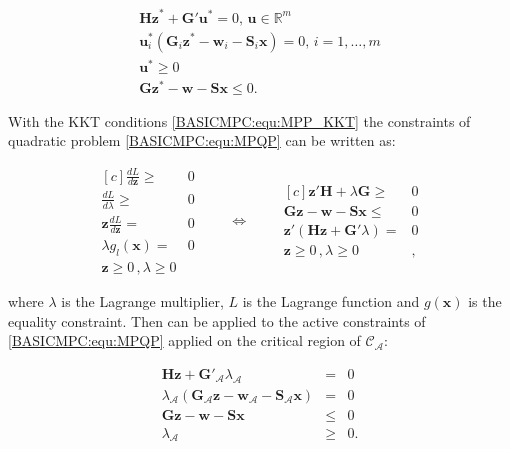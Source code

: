     \begin{subequations}
    \label{BASICMPC:equ:MPP_KKT}
        \begin{align}
        \textbf{Hz}^*+\textbf{G}'\textbf{u}^*=0,\,\textbf{u}\in\mathbb{R}^m        \label{BASICMPC:equ:MPP_KKT_a} \\
        \textbf{u}^*_i(\textbf{G}_i\textbf{z}^*-\textbf{w}_i-\textbf{S}_i\textbf{x})=0,\,i=1,\dots,m \label{BASICMPC:equ:MPP_KKT_b} \\
        \textbf{u}^*\geq 0 \label{BASICMPC:equ:MPP_KKT_c} \\
        \textbf{G}\textbf{z}^*-\textbf{w}-\textbf{S}\textbf{x}\leq 0 \label{BASICMPC:equ:MPP_KKT_d}.
    \end{align}
    \end{subequations}

    With the KKT conditions \ref{BASICMPC:equ:MPP_KKT} the constraints of quadratic problem \ref{BASICMPC:equ:MPQP} can be written as:

    \begin{equation}
        \label{BASICMPC:equ:MPP_KKT_result}
        \begin{aligned}[c]
            \frac{dL}{d\textbf{z}}\geq& 0\\
            \frac{dL}{d\lambda}\geq& 0\\
            \textbf{z}\frac{dL}{d\textbf{z}}=&0\\
            \lambda g_l(\textbf{x})=&0\\
            \textbf{z}\geq0\,,\lambda\geq0&
        \end{aligned}
        \qquad\Longleftrightarrow\qquad
        \begin{aligned}[c]
            \textbf{z}'\textbf{H}+\lambda\textbf{G}\geq&0\\
            \textbf{Gz}-\textbf{w}-\textbf{Sx}\leq&0\\
            \textbf{z}'(\textbf{Hz}+\textbf{G}'\lambda)=&0\\
            \textbf{z}\geq0\,,\lambda\geq0&,
        \end{aligned}
    \end{equation}

    where $\lambda$ is the Lagrange multiplier, $L$ is the Lagrange function and $g(\textbf{x})$ is the equality constraint. Then \label{BASICMPC:equ:MPP_KKT_result} can be applied to the active constraints of \ref{BASICMPC:equ:MPQP} applied on the critical region of $\mathcal{C}_{\mathcal{A}}$:

    \begin{equation}
    \begin{array}{rcl}
            \textbf{Hz}+\textbf{G}'_{\mathcal{A}}\lambda_{\mathcal{A}}&=&0\\
            \lambda_{\mathcal{A}}(\textbf{G}_{\mathcal{A}}\textbf{z}-\textbf{w}_{\mathcal{A}}-\textbf{S}_{\mathcal{A}}\textbf{x})&=&0\\
            \textbf{G}\textbf{z}-\textbf{w}-\textbf{S}\textbf{x}&\leq&0\\
            \lambda_{\mathcal{A}}&\geq&0.
        \end{array}
        \label{BASICMPC:equ:KKT_active}
    \end{equation}

